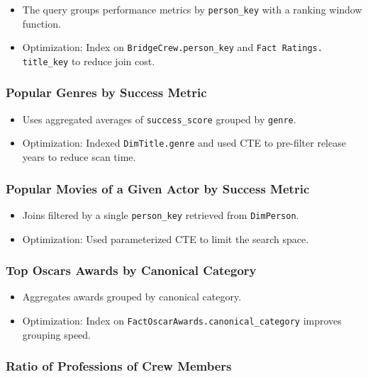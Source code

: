 \begin{itemize}
	\item The query groups performance metrics by \texttt{person\_key} with a ranking window function.  
	\item Optimization: Index on \texttt{BridgeCrew.person\_key} and \texttt{Fact Ratings. title\_key} to reduce join cost.
\end{itemize}

\subsubsection{Popular Genres by Success Metric}

\begin{itemize}
\item Uses aggregated averages of \texttt{success\_score} grouped by \texttt{genre}.  
\item Optimization: Indexed \texttt{DimTitle.genre} and used CTE to pre-filter release years to reduce scan time.
\end{itemize}

\subsubsection{Popular Movies of a Given Actor by Success Metric}
\begin{itemize}
\item Joins filtered by a single \texttt{person\_key} retrieved from \texttt{DimPerson}.  
\item Optimization: Used parameterized CTE to limit the search space.
\end{itemize}

\subsubsection{Top Oscars Awards by Canonical Category}

\begin{itemize}
\item Aggregates awards grouped by canonical category.  
\item Optimization: Index on \texttt{FactOscarAwards.canonical\_category} improves grouping speed.
\end{itemize}

\subsubsection{Ratio of Professions of Crew Members}

